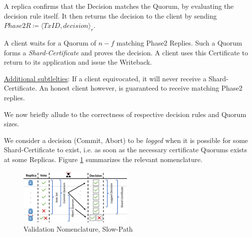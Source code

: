 A replica confirms that the Decision matches the Quorum, by evaluating the decision rule itself. It then returns the decision to the client by sending $Phase2R \coloneqq \langle TxID, decision \rangle_r$. 

A client waits for a Quorum of $n-f$ matching Phase2 Replies. Such a Quorum forms a \textit{Shard-Certificate} and proves the decision. A client uses this Certificate to return to its application and issue the Writeback.

\underline{Additional subtlelties}: If a client equivocated, it will never receive a Shard-Certificate. An honest client however, is guaranteed to receive matching Phase2 replies. 

We now briefly allude to the correctness of respective decision rules and Quorum sizes.



We consider a decision (Commit, Abort) to be \textit{logged} when it is possible for some Shard-Certificate to exist, i.e. as soon as the necessary certificate Quorums exists at some Replicas.
Figure \ref{fig:FigureSP} summarizes the relevant nomenclature.

\begin{figure}
\begin{center}
\includegraphics[width= 0.5\textwidth]{./figures/SPNomen.png}
\end{center}
\caption{Validation Nomenclature, Slow-Path}
\label{fig:FigureSP}
\end{figure}

